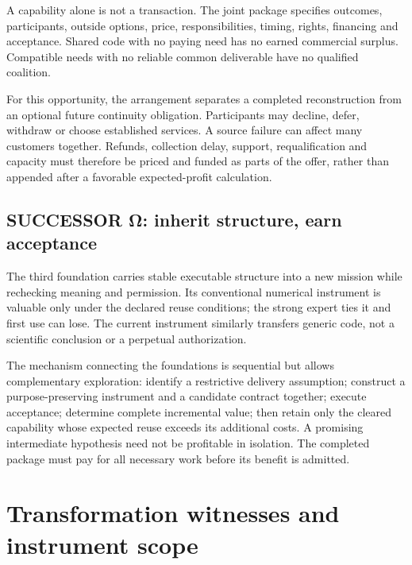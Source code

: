\documentclass[11pt]{article}
\begin{document}
A capability alone is not a transaction. The joint package specifies outcomes, participants, outside options, price, responsibilities, timing, rights, financing and acceptance. Shared code with no paying need has no earned commercial surplus. Compatible needs with no reliable common deliverable have no qualified coalition.\citep{economy}

For this opportunity, the arrangement separates a completed reconstruction from an optional future continuity obligation. Participants may decline, defer, withdraw or choose established services. A source failure can affect many customers together. Refunds, collection delay, support, requalification and capacity must therefore be priced and funded as parts of the offer, rather than appended after a favorable expected-profit calculation.

\subsection{SUCCESSOR Ω: inherit structure, earn acceptance}

The third foundation carries stable executable structure into a new mission while rechecking meaning and permission. Its conventional numerical instrument is valuable only under the declared reuse conditions; the strong expert ties it and first use can lose.\citep{harness} The current instrument similarly transfers generic code, not a scientific conclusion or a perpetual authorization.

The mechanism connecting the foundations is sequential but allows complementary exploration: identify a restrictive delivery assumption; construct a purpose-preserving instrument and a candidate contract together; execute acceptance; determine complete incremental value; then retain only the cleared capability whose expected reuse exceeds its additional costs. A promising intermediate hypothesis need not be profitable in isolation. The completed package must pay for all necessary work before its benefit is admitted.

\section{Transformation witnesses and instrument scope}
\end{document}
